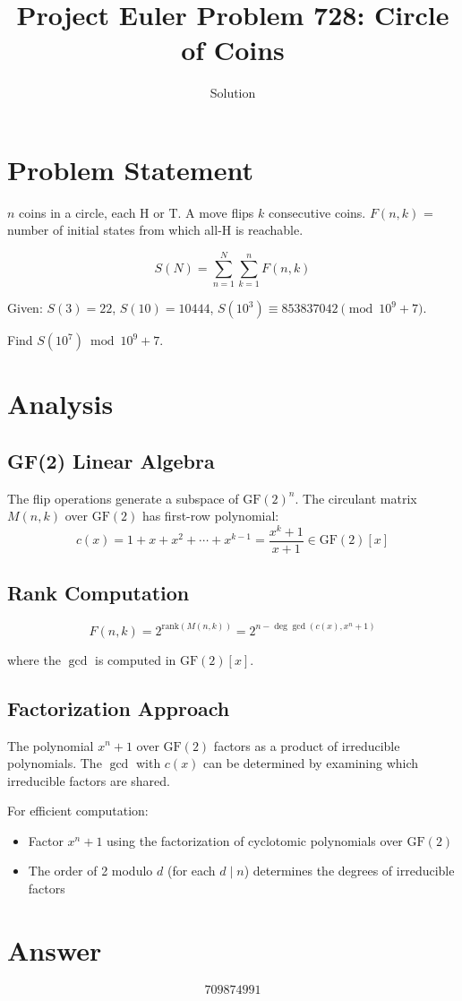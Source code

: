 \documentclass[12pt]{article}
\title{Project Euler Problem 728: Circle of Coins}
\author{Solution}
\date{}
\begin{document}
\maketitle

\section{Problem Statement}

$n$ coins in a circle, each H or T. A move flips $k$ consecutive coins. $F(n,k)$ = number of initial states from which all-H is reachable.

\[
S(N) = \sum_{n=1}^{N} \sum_{k=1}^{n} F(n,k)
\]

Given: $S(3) = 22$, $S(10) = 10444$, $S(10^3) \equiv 853837042 \pmod{10^9+7}$.

Find $S(10^7) \bmod 10^9+7$.

\section{Analysis}

\subsection{GF(2) Linear Algebra}

The flip operations generate a subspace of $\text{GF}(2)^n$. The circulant matrix $M(n,k)$ over $\text{GF}(2)$ has first-row polynomial:
\[
c(x) = 1 + x + x^2 + \cdots + x^{k-1} = \frac{x^k + 1}{x + 1} \in \text{GF}(2)[x]
\]

\subsection{Rank Computation}

\[
F(n,k) = 2^{\text{rank}(M(n,k))} = 2^{n - \deg\gcd(c(x), x^n + 1)}
\]

where the $\gcd$ is computed in $\text{GF}(2)[x]$.

\subsection{Factorization Approach}

The polynomial $x^n + 1$ over $\text{GF}(2)$ factors as a product of irreducible polynomials. The $\gcd$ with $c(x)$ can be determined by examining which irreducible factors are shared.

For efficient computation:
\begin{itemize}
\item Factor $x^n + 1$ using the factorization of cyclotomic polynomials over $\text{GF}(2)$
\item The order of 2 modulo $d$ (for each $d \mid n$) determines the degrees of irreducible factors
\end{itemize}

\section{Answer}

\[
\boxed{709874991}
\]
\end{document}
